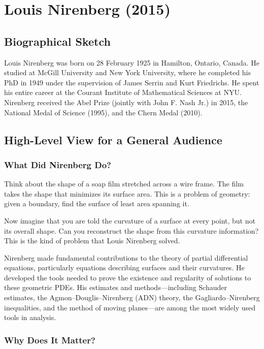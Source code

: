 \chapter{Louis Nirenberg (2015)}

\section{Biographical Sketch}

Louis Nirenberg was born on 28 February 1925 in Hamilton, Ontario, Canada. He studied at McGill University and New York University, where he completed his PhD in 1949 under the supervision of James Serrin and Kurt Friedrichs. He spent his entire career at the Courant Institute of Mathematical Sciences at NYU. Nirenberg received the Abel Prize (jointly with John F. Nash Jr.) in 2015, the National Medal of Science (1995), and the Chern Medal (2010).

\section{High-Level View for a General Audience}

\subsection{What Did Nirenberg Do?}

Think about the shape of a soap film stretched across a wire frame. The film takes the shape that minimizes its surface area. This is a problem of geometry: given a boundary, find the surface of least area spanning it.

Now imagine that you are told the curvature of a surface at every point, but not its overall shape. Can you reconstruct the shape from this curvature information? This is the kind of problem that Louis Nirenberg solved.

Nirenberg made fundamental contributions to the theory of partial differential equations, particularly equations describing surfaces and their curvatures. He developed the tools needed to prove the existence and regularity of solutions to these geometric PDEs. His estimates and methods---including Schauder estimates, the Agmon--Douglis--Nirenberg (ADN) theory, the Gagliardo--Nirenberg inequalities, and the method of moving planes---are among the most widely used tools in analysis.

\subsection{Why Does It Matter?}

